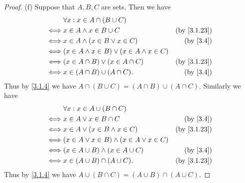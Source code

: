 \begin{proof}{(f)}
  Suppose that \(A, B, C\) are sets.
  Then we have
  \begin{align*}
         & \forall x : x \in A \cap (B \cup C)                                              \\
    \iff & x \in A \land x \in B \cup C                         & \text{(by \cref{3.1.23})} \\
    \iff & x \in A \land (x \in B \lor x \in C)                 & \text{(by \cref{3.4})}    \\
    \iff & (x \in A \land x \in B) \lor (x \in A \land x \in C)                             \\
    \iff & (x \in A \cap B) \lor (x \in A \cap C)               & \text{(by \cref{3.1.23})} \\
    \iff & x \in (A \cap B) \cup (A \cap C).                    & \text{(by \cref{3.4})}
  \end{align*}
  Thus by \cref{3.1.4} we have \(A \cap (B \cup C) = (A \cap B) \cup (A \cap C)\).
  Similarly we have
  \begin{align*}
         & \forall x : x \in A \cup (B \cap C)                                             \\
    \iff & x \in A \lor x \in B \cap C                         & \text{(by \cref{3.4})}    \\
    \iff & x \in A \lor (x \in B \land x \in C)                & \text{(by \cref{3.1.23})} \\
    \iff & (x \in A \lor x \in B) \land (x \in A \lor x \in C)                             \\
    \iff & (x \in A \cup B) \land (x \in A \cup C)             & \text{(by \cref{3.4})}    \\
    \iff & x \in (A \cup B) \cap (A \cup C).                   & \text{(by \cref{3.1.23})}
  \end{align*}
  Thus by \cref{3.1.4} we have \(A \cup (B \cap C) = (A \cup B) \cap (A \cup C)\).
\end{proof}

